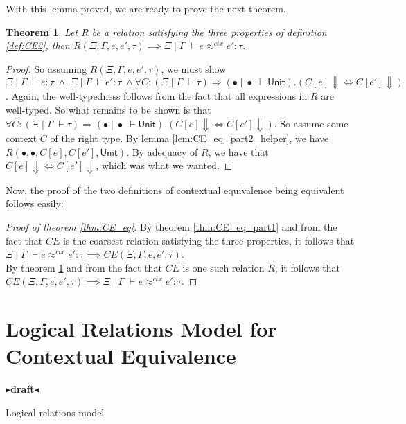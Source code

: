 \documentclass[twoside,11pt,openright]{report}
\newtheorem{theorem}{Theorem}
\theoremstyle{definition}
\newcommand{\expr}{e}
\newcommand{\ctx}{C}
\newcommand{\Tunit}{\mathsf{Unit}}
\newcommand{\typ}{\tau}
\newcommand{\venv}{\Gamma}
\newcommand{\tenv}{\Xi}
\newcommand{\empvenv}{\bullet}
\newcommand{\emptenv}{\bullet}
\newcommand{\jdg}[4]{#1 \; | \; #2 \; \vdash #3 : #4}
\newcommand{\jdgType}[3]{#1 \; | \; #2 \; \vdash #3}
\newcommand{\jdgRel}[6]{#1 \; | \; #2 \; \vdash #3 \approx^{#4} #5 : #6}
\newcommand{\ctxRel}[5]{\jdgRel{#1}{#2}{#3}{ctx}{#4}{#5}}
\newcommand{\todo}[1]{{\color[rgb]{.5,0,0}\textbf{$\blacktriangleright$#1$\blacktriangleleft$}}}
\begin{document}
With this lemma proved, we are ready to prove the next theorem.
\begin{theorem}\label{thm:CE_eq_part2}
  Let $R$ be a relation satisfying the three properties of definition \ref{def:CE2}, then $R(\tenv, \venv, \expr, \expr', \typ) \implies \ctxRel{\tenv}{\venv}{\expr}{\expr'}{\typ}$.
\end{theorem}
\begin{proof}
  So assuming $R(\tenv, \venv, \expr, \expr', \typ)$, we must show 
  $\jdg{\tenv}{\venv}{\expr}{\typ} \; \land \; \jdg{\tenv}{\venv}{\expr'}{\typ} \; \land \forall \ctx : (\jdgType{\tenv}{\venv}{\typ}) \Rightarrow (\jdgType{\emptenv}{\empvenv}{\Tunit}) . (\ctx[\expr] \Downarrow \iff \ctx[\expr'] \Downarrow)$. Again, the well-typedness follows from the fact that all expressions in $R$ are well-typed. So what remains to be shown is that $\forall \ctx : (\jdgType{\tenv}{\venv}{\typ}) \Rightarrow (\jdgType{\emptenv}{\empvenv}{\Tunit}) . (\ctx[\expr] \Downarrow \iff \ctx[\expr'] \Downarrow)$. So assume some context $C$ of the right type. By lemma \ref{lem:CE_eq_part2_helper}, we have $R(\emptenv, \empvenv, C[\expr], C[\expr'], \Tunit)$. By adequacy of $R$, we have that $\ctx[\expr] \Downarrow \iff \ctx[\expr'] \Downarrow$, which was what we wanted.
\end{proof}

Now, the proof of the two definitions of contextual equivalence being equivalent follows easily:
\begin{proof}[Proof of theorem \ref{thm:CE_eq}]
  By theorem \ref{thm:CE_eq_part1} and from the fact that $CE$ is the coarsest relation satisfying the three properties, it follows that $\ctxRel{\tenv}{\venv}{\expr}{\expr'}{\typ} \implies CE(\tenv, \venv, \expr, \expr', \typ)$.\\
  By theorem \ref{thm:CE_eq_part2} and from the fact that $CE$ is one such relation $R$, it follows that $CE(\tenv, \venv, \expr, \expr', \typ) \implies \ctxRel{\tenv}{\venv}{\expr}{\expr'}{\typ}$.
\end{proof}


\chapter{Logical Relations Model for Contextual Equivalence}
\label{ch:LR}

\todo{draft}

Logical relations model
\end{document}
